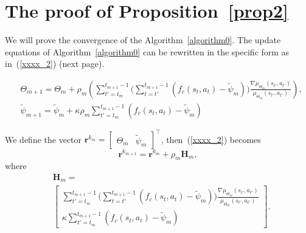 \documentclass[twocolumn,10pt]{IEEEtran}
\begin{document}
\section{The proof of Proposition~\ref{prop2}}
\label{appendix:prop2}
We will prove the convergence of the Algorithm~\ref{algorithm0}. The update equations of Algorithm~\ref{algorithm0} can be rewritten in the specific form as in~(\ref{xxxx_2}) (next page).
\begin{figure*}[!t]
	\normalsize
	\begin{equation}
	\label{xxxx_2}
	\begin{aligned}
	&\Theta_{m+1} = \Theta_{m} + \rho_{m} \left( \sum_{t'=t_{m}}^{t_{m+1}-1} \Big( \sum_{t=t'}^{t_{m+1}-1}( f_c(s_t,a_t) - \widetilde{\psi}_{m}) \Big) \frac{\nabla \mu_{\Theta_{m}}(s_{t'},a_{t'})}{\mu_{\Theta_{m}}(s_{t'},a_{t'})} \right), \\
	&\widetilde{\psi}_{m+1} = \widetilde{\psi}_{m} + \kappa\rho_{m}\sum_{t'=t_{m}}^{t_{m+1}-1}( f_c (s_{t}, a_{t}) - \widetilde{\psi}_{m})
	\end{aligned}
	\end{equation}
	\vspace*{-15pt}
	\hrulefill
\end{figure*}

We define the vector $\mathbf{r}^{k_m}=\left[	\begin{array}{cc}	\Theta_m	&	\widetilde{\psi}_{m}	\end{array}	\right]^\top$, then~(\ref{xxxx_2}) becomes
\begin{equation}
\label{xxxx_3}
\mathbf{r}^{k_{m+1}} = \mathbf{r}^{k_m} + \rho_{m} \mathbf{H}_m,
\end{equation}
where 
\begin{equation}
\begin{aligned}
&\mathbf{H}_m \!	 = \\
& \!	\left[\!	\begin{array}{c}
\sum_{t'=t_{m}}^{t_{m+1}-1} \Big( \sum_{t=t'}^{t_{m+1}-1}( f_c (s_{t}, a_{t}) - \widetilde{\psi}_{m}) \Big) \frac{\nabla \mu_{\Theta_{m}}(s_{t'},a_{t'})}{\mu_{\Theta_{m}}(s_{t'},a_{t'})}	\\
\kappa \sum_{t'=t_{m}}^{t_{m+1}-1}( f_c (s_{t}, a_{t}) - \widetilde{\psi}_{m})
\end{array}	\! \right].
\end{aligned}
\end{equation}
\end{document}
